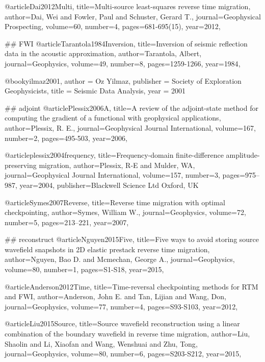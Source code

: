 {@article{Dai2012Multi,
  title={Multi-source least-squares reverse time migration},
  author={Dai, Wei and Fowler, Paul and Schuster, Gerard T.},
  journal={Geophysical Prospecting},
  volume={60},
  number={4},
  pages={681-695(15)},
  year={2012},
}

## FWI
@article{Tarantola1984Inversion,
  title={Inversion of seismic reflection data in the acoustic approximation},
  author={Tarantola, Albert},
  journal={Geophysics},
  volume={49},
  number={8},
  pages={1259-1266},
  year={1984},
}

@book{yilmaz2001,
   author = {Oz Yilmaz},
   publisher = {Society of Exploration Geophysicists},
   title = {Seismic Data Analysis},
   year = {2001}
}

## adjoint
@article{Plessix2006A,
  title={A review of the adjoint-state method for computing the gradient of a functional with geophysical applications},
  author={Plessix, R. E.},
  journal={Geophysical Journal International},
  volume={167},
  number={2},
  pages={495-503},
  year={2006},
}

@article{plessix2004frequency,
  title={Frequency-domain finite-difference amplitude-preserving migration},
  author={Plessix, R-E and Mulder, WA},
  journal={Geophysical Journal International},
  volume={157},
  number={3},
  pages={975--987},
  year={2004},
  publisher={Blackwell Science Ltd Oxford, UK}
}

@article{Symes2007Reverse,
  title={Reverse time migration with optimal checkpointing},
  author={Symes, William W.},
  journal={Geophysics},
  volume={72},
  number={5},
  pages={213--221},
  year={2007},
}


## reconstruct
@article{Nguyen2015Five,
  title={Five ways to avoid storing source wavefield snapshots in 2D elastic prestack reverse time migration},
  author={Nguyen, Bao D. and Mcmechan, George A.},
  journal={Geophysics},
  volume={80},
  number={1},
  pages={S1-S18},
  year={2015},
}

@article{Anderson2012Time,
  title={Time-reversal checkpointing methods for {RTM} and {FWI}},
  author={Anderson, John E. and Tan, Lijian and Wang, Don},
  journal={Geophysics},
  volume={77},
  number={4},
  pages={S93-S103},
  year={2012},
}

@article{Liu2015Source,
  title={Source wavefield reconstruction using a linear combination of the boundary wavefield in reverse time migration},
  author={Liu, Shaolin and Li, Xiaofan and Wang, Wenshuai and Zhu, Tong},
  journal={Geophysics},
  volume={80},
  number={6},
  pages={S203-S212},
  year={2015},
}

}
